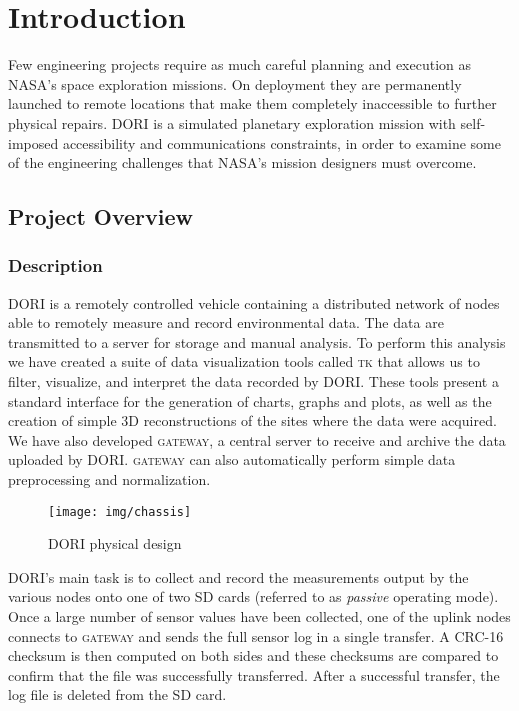 \chapter{Introduction}
Few engineering projects require as much careful planning and execution as NASA's space exploration missions. On deployment they are permanently launched to remote locations that make them completely inaccessible to further physical repairs. DORI is a simulated planetary exploration mission with self-imposed accessibility and communications constraints, in order to examine some of the engineering challenges that NASA's mission designers must overcome.


\section{Project Overview}
\subsection{Description}
\textsc{DORI} is a remotely controlled vehicle containing a distributed network of nodes able to remotely measure and record environmental data. The data are transmitted to a server for storage and manual analysis. To perform this analysis we have created a suite of data visualization tools called \textsc{tk} that allows us to filter, visualize, and interpret the data recorded by \textsc{DORI}. These tools present a standard interface for the generation of charts, graphs and plots, as well as the creation of simple 3D reconstructions of the sites where the data were acquired. We have also developed \textsc{gateway}, a central server to receive and archive the data uploaded by \textsc{DORI}. \textsc{gateway} can also automatically perform simple data preprocessing and normalization.

    \begin{figure}[h]
        \centering
        \texttt{[image: img/chassis]}
        \caption{DORI physical design}
    \end{figure}

    DORI's main task is to collect and record the measurements output by the various nodes onto one of two SD cards (referred to as \emph{passive} operating mode). Once a large number of sensor values have been collected, one of the uplink nodes connects to \textsc{gateway} and sends the full sensor log in a single transfer. A CRC-16 checksum is then computed on both sides and these checksums are compared to confirm that the file was successfully transferred. After a successful transfer, the log file is deleted from the SD card.

